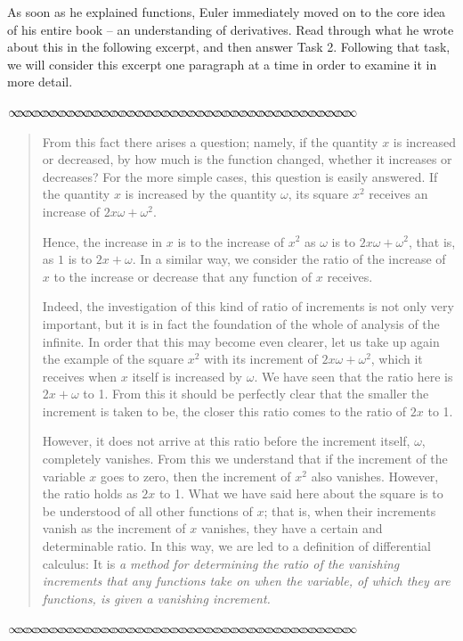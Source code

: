 \documentclass[11pt]{article}
\newcommand{\sep}{\vspace{-3pt}
\begin{center}
{\mathversion{normal}
$\infty \mspace{-5.5mu}\infty \mspace{-5.5mu}\infty \mspace{-5.5mu}\infty \mspace{-5.5mu}
\infty \mspace{-5.5mu}\infty \mspace{-5.5mu}\infty \mspace{-5.5mu}\infty \mspace{-5.5mu}
\infty \mspace{-5.5mu}\infty \mspace{-5.5mu}\infty \mspace{-5.5mu}\infty \mspace{-5.5mu}
\infty \mspace{-5.5mu}\infty \mspace{-5.5mu}\infty \mspace{-5.5mu}\infty \mspace{-5.5mu}
\infty \mspace{-5.5mu}\infty \mspace{-5.5mu}\infty \mspace{-5.5mu}\infty \mspace{-5.5mu}
\infty \mspace{-5.5mu}\infty \mspace{-5.5mu}\infty \mspace{-5.5mu}\infty \mspace{-5.5mu}
\infty \mspace{-5.5mu}\infty \mspace{-5.5mu}\infty \mspace{-5.5mu}\infty \mspace{-5.5mu}
\infty \mspace{-5.5mu}\infty \mspace{-5.5mu}\infty \mspace{-5.5mu}\infty \mspace{-5.5mu}
\infty \mspace{-5.5mu}\infty \mspace{-5.5mu}\infty \mspace{-5.5mu}\infty \mspace{-5.5mu}
\infty \mspace{-5.5mu}\infty \mspace{-5.5mu}\infty \mspace{-5.5mu}\infty \mspace{-5.5mu}$}
\end{center} \vspace*{-5pt}}
\newenvironment{source}%
 {\bigskip \sep \vspace*{-6pt} \begin{quote}
          \begin{sf}   }
   {   \end{sf}     \end{quote} \vspace*{-6pt} \sep \bigskip}%
\begin{document}
As soon as he explained functions, Euler immediately moved on to the core idea of his entire book -- an understanding of derivatives.  Read through what he wrote about this in the following excerpt, and then answer Task 2.  Following that task, we will consider this excerpt one paragraph at a time in order to examine it in more detail.



\begin{source}
\vspace*{-6pt}

From this fact there arises a question; namely, if the quantity $x$ is increased or decreased, by how much is the function changed, whether it increases or decreases?  For the more simple cases, this question is easily answered.  If the quantity $x$ is increased by the quantity $\omega$, its square $x^2$ receives an increase of $2x\omega + \omega^2$.

Hence, the increase in $x$ is to the increase of $x^2$ as $\omega$ is to $2x\omega + \omega^2$, that is, as $1$ is to $2x + \omega$.  In a similar way, we consider the ratio of the increase of $x$ to the increase or decrease that any function of $x$ receives.

Indeed, the investigation of this kind of ratio of increments is not
only very important, but it is in fact the foundation of the whole of analysis
of the infinite. In order that this may become even clearer, let us take up
again the example of the square $x^2$ with its increment of $2x\omega +\omega^2$, which
it receives when $x$ itself is increased by $\omega$. We have seen that the ratio here
is $2x + \omega$ to 1. From this it should be perfectly clear that the smaller the
increment is taken to be, the closer this ratio comes to the ratio of $2x$ to
1.

However, it does not arrive at this ratio before the increment itself, $\omega$,
completely vanishes. From this we understand that if the increment of the
variable $x$ goes to zero, then the increment of $x^2$ also vanishes. However,
the ratio holds as $2x$ to 1. What we have said here about the square is to
be understood of all other functions of $x$; that is, when their increments
vanish as the increment of $x$ vanishes, they have a certain and determinable
ratio. In this way, we are led to a definition of differential calculus: It is
\emph{a method for determining the ratio of the vanishing increments that any
functions take on when the variable, of which they are functions, is given a
vanishing increment.}


\vspace*{-8pt}
\end{source}
\end{document}
